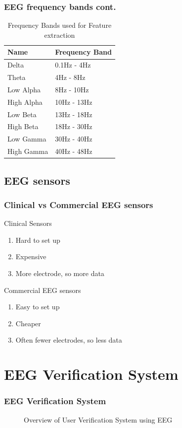 \documentclass[unknownkeysallowed]{beamer}
\begin{document}
\begin{frame}
	\frametitle{EEG frequency bands cont.}
    	\begin{table}[h!]
		\centering
		\caption{Frequency Bands used for Feature extraction}
		\label{Table:Bands_more}
		\begin{tabular}{l l}
			\hline
			Name &Frequency Band\\\hline
			Delta&0.1Hz - 4Hz\\
			Theta&4Hz - 8Hz\\
            Low Alpha&8Hz - 10Hz\\
			High Alpha&10Hz - 13Hz\\
            Low Beta&13Hz - 18Hz\\
			High Beta&18Hz - 30Hz\\
            Low Gamma&30Hz - 40Hz\\
			High Gamma&40Hz - 48Hz\\
		\end{tabular}
	\end{table}
\end{frame}
\subsection{EEG sensors}
\begin{frame}
  \frametitle{Clinical vs Commercial EEG sensors}
  Clinical Sensors\\
  \pause
  \begin{enumerate}
    \item Hard  to set up
    \pause
    \item Expensive
    \pause
    \item More electrode, so more data
    \pause
  \end{enumerate}
  
  Commercial EEG sensors
  \pause
  \begin{enumerate}
    \item Easy  to set up
    \pause
    \item Cheaper 
    \pause
    \item Often fewer electrodes, so less data
  \end{enumerate}
\end{frame}

\section{EEG Verification System}

\begin{frame}
	\frametitle{EEG Verification System}
		\begin{figure}[hbtp]
    		\caption{Overview of User Verification System using EEG}
    		\label{fig:FlowChart}
            
    	\end{figure}
\end{frame}
\end{document}
